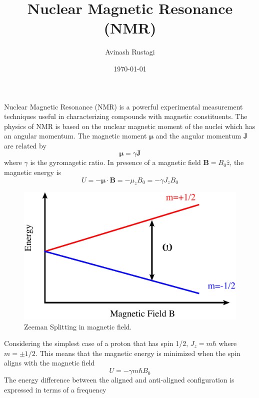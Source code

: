 \documentclass[aps,prb,onecolumn,notitlepage,showpacs,floatfix,superscriptaddress]{revtex4-1}
\begin{document}
\title{Nuclear Magnetic Resonance (NMR)}

\author{Avinash Rustagi}
%
\date{\today}

\maketitle
Nuclear Magnetic Resonance (NMR) is a powerful experimental measurement techniques useful in characterizing compounds with magnetic constituents. The physics of NMR is based on the nuclear magnetic moment of the nuclei which has an angular momentum. The magnetic moment ${\bm \mu}$ and the angular momentum ${\bm J}$ are related by
\begin{equation}
{\bm \mu} = \gamma {\bm J}
\end{equation} 
where $\gamma$ is the gyromagetic ratio. In presence of a magnetic field ${\bm B}=B_0 \hat{z}$, the magnetic energy is
\begin{equation}
U=-{\bm \mu} \cdot {\bm B} = - \mu_z B_0 = -\gamma J_z B_0
\end{equation}
\begin{figure}[hbtp]
\centering
\includegraphics[scale=0.06]{Zeeman.png}
\caption{Zeeman Splitting in magnetic field.}
\end{figure}
Considering the simplest case of a proton that has spin 1/2, $J_z = m \hbar$ where $m= \pm 1/2$. This means that the magnetic energy is minimized when the spin aligns with the magnetic field
\begin{equation}
U= -\gamma m \hbar B_0
\end{equation}
The energy difference between the aligned and anti-aligned configuration is expressed in terms of a frequency
\end{document}
